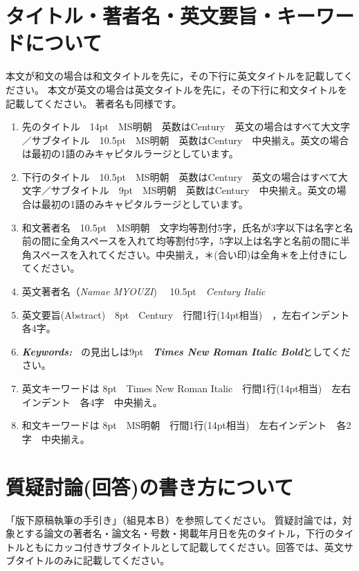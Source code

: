\documentclass[base=11pt,magstyle=real,a4paper,twocolumn,xelatex,pandoc,jafont=ms]{bxjsarticle}
\begin{document}
\section{タイトル・著者名・英文要旨・キーワードについて}
	本文が和文の場合は和文タイトルを先に，その下行に英文タイトルを記載してください。
	本文が英文の場合は英文タイトルを先に，その下行に和文タイトルを記載してください。
	著者名も同様です。
	
	\begin{enumerate}
		\renewcommand{\labelenumi}{$ \textcircled{\scriptsize\arabic{enumi}} $}%
		\item 先のタイトル　14pt　MS明朝　英数はCentury　英文の場合はすべて大文字／サブタイトル　10.5pt　MS明朝　英数はCentury　中央揃え。英文の場合は最初の1語のみキャピタルラージとしています。
		
		\item 下行のタイトル　10.5pt　MS明朝　英数はCentury　英文の場合はすべて大文字／サブタイトル　9pt　MS明朝　英数はCentury　中央揃え。英文の場合は最初の1語のみキャピタルラージとしています。
		
		\item 和文著者名　10.5pt　MS明朝　文字均等割付5字，氏名が3字以下は名字と名前の間に全角スペースを入れて均等割付5字，5字以上は名字と名前の間に半角スペースを入れてください。中央揃え，＊(合い印)は全角＊を上付きにしてください。
		
		\item 英文著者名（\textit{Namae MYOUZI})　 10.5pt　\textit{Century Italic}  
		
		\item 英文要旨(Abstract)　8pt　Century　行間1行(14pt相当)　，左右インデント　各4字。	
		
		\item {\timesnewroman\textit {\textbf{Keywords:~}}} の見出しは9pt　{\timesnewroman\textit {\textbf{Times New Roman Italic Bold}}}としてください。

		\item 英文キーワードは 8pt　Times New Roman Italic　行間1行(14pt相当)　左右インデント　各4字　中央揃え。

		\item 和文キーワードは 8pt　MS明朝　行間1行(14pt相当)　左右インデント　各2字　中央揃え。
		
	\end{enumerate}

\section{質疑討論(回答)の書き方について}
「版下原稿執筆の手引き」（組見本Ｂ）を参照してください。
質疑討論では，対象とする論文の著者名・論文名・号数・掲載年月日を先のタイトル，下行のタイトルともにカッコ付きサブタイトルとして記載してください。回答では、英文サブタイトルのみに記載してください。
\end{document}
